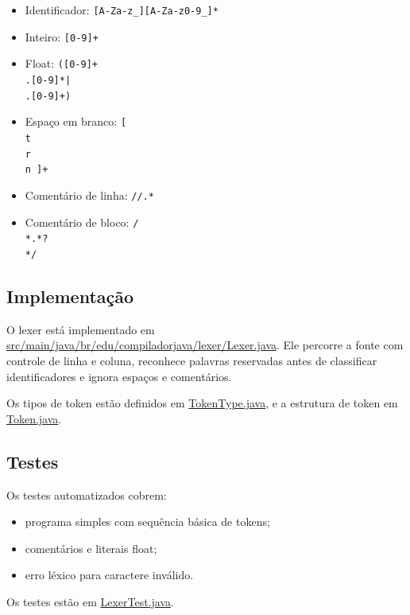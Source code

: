 \documentclass[12pt,a4paper]{article}
\begin{document}
\begin{itemize}[leftmargin=1.5em]
    \item Identificador: \texttt{[A-Za-z\_][A-Za-z0-9\_]*}
    \item Inteiro: \texttt{[0-9]+}
    \item Float: \texttt{([0-9]+\\.[0-9]*|\\.[0-9]+)}
    \item Espaço em branco: \texttt{[\\t\\r\\n ]+}
    \item Comentário de linha: \texttt{//.*}
    \item Comentário de bloco: \texttt{/\\*.*?\\*/}
\end{itemize}

\subsection*{Implementação}

O lexer está implementado em \href{../src/main/java/br/edu/compiladorjava/lexer/Lexer.java}{src/main/java/br/edu/compiladorjava/lexer/Lexer.java}. Ele percorre a fonte com controle de linha e coluna, reconhece palavras reservadas antes de classificar identificadores e ignora espaços e comentários.

Os tipos de token estão definidos em \href{../src/main/java/br/edu/compiladorjava/lexer/TokenType.java}{TokenType.java}, e a estrutura de token em \href{../src/main/java/br/edu/compiladorjava/lexer/Token.java}{Token.java}.

\subsection*{Testes}

Os testes automatizados cobrem:

\begin{itemize}[leftmargin=1.5em]
    \item programa simples com sequência básica de tokens;
    \item comentários e literais float;
    \item erro léxico para caractere inválido.
\end{itemize}

Os testes estão em \href{../src/test/java/br/edu/compiladorjava/lexer/LexerTest.java}{LexerTest.java}.
\end{document}
